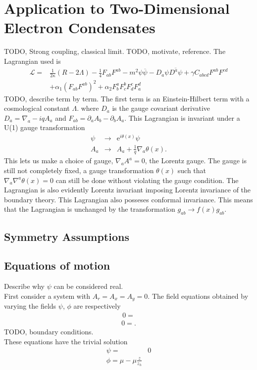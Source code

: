 \documentclass[12pt]{report}
\begin{document}
\chapter{Application to Two-Dimensional Electron Condensates}
TODO, Strong coupling, classical limit.
TODO, motivate, reference. The Lagrangian used is
\begin{eqnarray}
 \mathcal{L}=&\frac{1}{2\kappa}\left(R-2\Lambda\right)-\frac{1}{4}F_{ab}F^{ab}-m^2\psi\overline{\psi}-D_a\psi\overline{D^a\psi}
+\gamma C_{abcd}F^{ab}F^{cd}\nonumber\\
&+\alpha_1(F_{ab}F^{ab})^2+\alpha_2F^a_bF^b_cF^c_dF^d_a
\end{eqnarray}
TODO, describe term by term.
The first term is an Einstein-Hilbert term with a cosmological constant $\Lambda$.
where $D_a$ is the gauge covariant derivative $D_a=\nabla_a-iqA_a$ and $F_{ab}=\partial_aA_b-\partial_bA_a$. This Lagrangian is invariant under a U(1) gauge transformation
\begin{eqnarray}
 \psi&\rightarrow&\mathrm{e}^{i\theta(x)}\psi\\
 A_a&\rightarrow& A_a+\frac{1}{q}\nabla_a\theta(x).
\end{eqnarray}
This lets us make a choice of gauge, $\nabla_aA^a=0$, the Lorentz gauge. The gauge is still not completely fixed, a gauge transformation $\theta(x)$ such that $\nabla_a\nabla^a\theta(x)=0$ can still be done without violating the gauge condition.
The Lagrangian is also evidently Lorentz invariant imposing Lorentz invariance of the boundary theory. This Lagrangian also posseses conformal invariance. This means that the Lagrangian is unchanged by the transformation $g_{ab}\rightarrow f(x)g_{ab}$.
\section{Symmetry Assumptions}
\section{Equations of motion}
Describe why $\psi$ can be considered real.\\
First consider a system with $A_r=A_x=A_y=0$. The field equations obtained by varying the fields $\psi$, $\phi$ are respectively
\begin{eqnarray}
0=
\end{eqnarray}
\begin{eqnarray}
0=.
\end{eqnarray}
TODO, boundary conditions.\\
These equations have the trivial solution
\begin{equation}
 \begin{split}
  \psi=&0\\
  \phi=\mu-\mu\frac{z}{z_h}\label{trivial}
 \end{split}
\end{equation}
\end{document}

